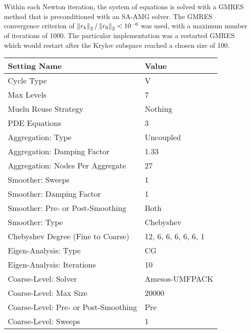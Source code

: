 Within each Newton iteration, the system of equations is solved with a GMRES method that is preconditioned with an SA-AMG solver. The GMRES convergence criterion of $\left\lVert r_k\right\rVert_2/\left\lVert r_0\right\rVert_2 < 10^{-6}$ was used, with a maximum number of iterations of 1000. The particular implementation was a restarted GMRES which would restart after the Krylov subspace reached a chosen size of 100.

\begin{table}[ht]
    \centering
    \begin{tabular}{|l|l|} 
    \hline
    Setting Name & Value \\
    \hline
    Cycle Type                          & V                     \\
    Max Levels                          & 7                     \\
    Muelu Reuse Strategy                & Nothing               \\
    PDE Equations                       & 3                     \\
    \hline
    Aggregation: Type                    & Uncoupled             \\
    Aggregation: Damping Factor          & 1.33                  \\
    Aggregation: Nodes Per Aggregate    & 27                    \\
    \hline
    Smoother: Sweeps                     & 1                     \\
    Smoother: Damping Factor             & 1                     \\
    Smoother: Pre- or Post-Smoothing     & Both                  \\
    Smoother: Type                       & Chebyshev             \\
    Chebyshev Degree (Fine to Coarse)       & 12, 6, 6, 6, 6, 6, 1  \\
    Eigen-Analysis: Type                 & CG                    \\
    Eigen-Analysis: Iterations           & 10                    \\
    \hline
    Coarse-Level: Solver                 & Amesos-UMFPACK        \\
    Coarse-Level: Max Size               & 20000                 \\
    Coarse-Level: Pre- or Post-Smoothing & Pre                   \\
    Coarse-Level: Sweeps                 & 1                     \\

\end{tabular}
\end{table}
